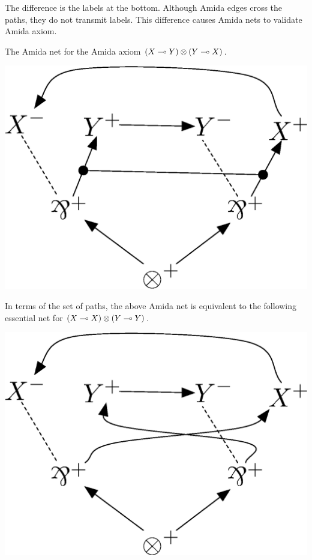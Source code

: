The difference is the labels at the bottom.
Although Amida edges cross the paths,
they do not transmit labels.
This difference causes Amida nets to validate Amida axiom.
 \begin{example}
  The Amida net for the Amida axiom $(X\multimap Y)\otimes(Y\multimap X)$.
   \begin{center}
    \includegraphics[scale=0.4]{amida-axiom.eps}
   \end{center}
  In terms of the set of paths, the above Amida net is equivalent to the
  following essential net for $(X\multimap X)\otimes (Y\multimap Y)$.
   \begin{center}
    \includegraphics[scale=0.4]{amida-axiom-cross.eps}
   \end{center}
 \end{example}

